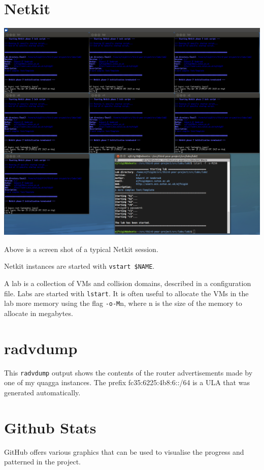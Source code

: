 \chapter{Netkit}
\begin{center}
	\includegraphics[width=\linewidth]{../Diagrams/Netkit/NetkitScreenshot.png}
\end{center}

Above is a screen shot of a typical Netkit session.  

Netkit instances are started with \texttt{vstart \$NAME}.

A lab is a collection of VMs and collision domains, described in a
configuration file. Labs are started with \texttt{lstart}. It is often useful
to allocate the VMs in the lab more memory using the flag \texttt{-o-M}n, where
n is the size of the memory to allocate in megabytes.

\chapter{radvdump}
This \texttt{radvdump} output shows the contents of the router advertisements
made by one of my quagga instances. The prefix fc35:6225:4b8:6::/64 is a ULA
that was generated automatically.



\chapter{Github Stats}
\label{GithubStats}
GitHub offers various graphics that can be used to visualise the progress and
patterned in the project. 

